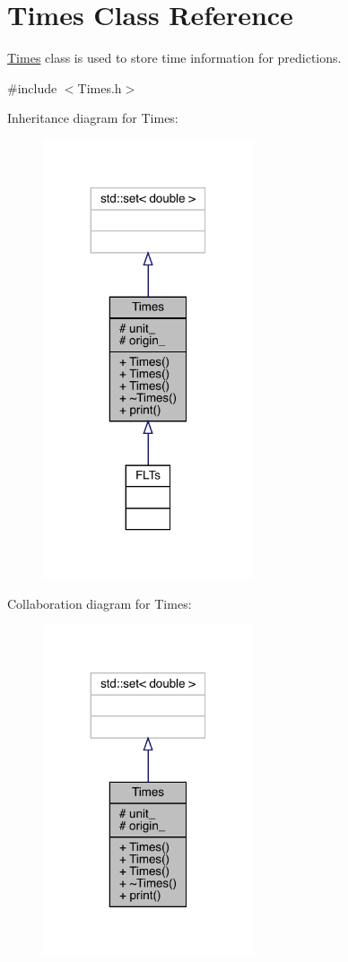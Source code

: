 \hypertarget{class_times}{}\section{Times Class Reference}
\label{class_times}


\mbox{\hyperlink{class_times}{Times}} class is used to store time information for predictions.  




{\ttfamily \#include $<$Times.\+h$>$}



Inheritance diagram for Times\+:
\nopagebreak
\begin{figure}[H]
\begin{center}
\leavevmode
\includegraphics[width=176pt]{class_times__inherit__graph}
\end{center}
\end{figure}


Collaboration diagram for Times\+:\nopagebreak
\begin{figure}[H]
\begin{center}
\leavevmode
\includegraphics[width=176pt]{class_times__coll__graph}
\end{center}
\end{figure}
